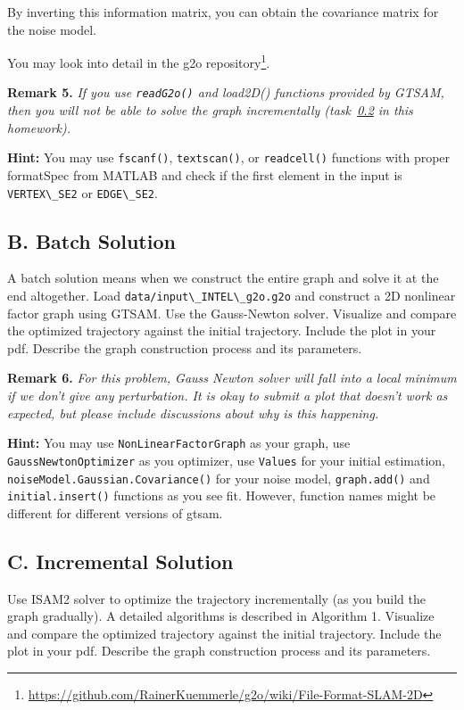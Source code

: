 \documentclass[tp]{lcc}
\begin{document}
By inverting this information matrix, you can obtain the covariance matrix for the noise model.

You may look into detail in the g2o repository\footnote{\url{https://github.com/RainerKuemmerle/g2o/wiki/File-Format-SLAM-2D}}.

\textbf{Remark 5.} \textit{If you use \lstinline[style=bash]{readG2o()} and load2D() functions provided by GTSAM, then you will not be able to solve the graph incrementally (task~\ref{sec:incremental_solution} in this homework).}

\textbf{Hint:} You may use \lstinline[style=bash]{fscanf()}, \lstinline[style=bash]{textscan()}, or \lstinline[style=bash]{readcell()} functions with proper formatSpec from MATLAB and check if the first element in the input is \lstinline[style=bash]{VERTEX\_SE2} or \lstinline[style=bash]{EDGE\_SE2}.

\subsection{B. Batch Solution}
A batch solution means when we construct the entire graph and solve it at the end altogether. Load \lstinline[style=bash]{data/input\_INTEL\_g2o.g2o} and construct a 2D nonlinear factor graph using GTSAM. Use the Gauss-Newton solver. Visualize and compare the optimized trajectory against the initial trajectory. Include the plot in your pdf. Describe the graph construction process and its parameters.

\textbf{Remark 6.} \textit{For this problem, Gauss Newton solver will fall into a local minimum if we don't give any perturbation. It is okay to submit a plot that doesn't work as expected, but please include discussions about why is this happening.}

\textbf{Hint:} You may use \lstinline[style=bash]{NonLinearFactorGraph} as your graph, use \lstinline[style=bash]{GaussNewtonOptimizer} as you optimizer, use \lstinline[style=bash]{Values} for your initial estimation, \lstinline[style=bash]{noiseModel.Gaussian.Covariance()} for your noise model, \lstinline[style=bash]{graph.add()} and \lstinline[style=bash]{initial.insert()} functions as you see fit. However, function names might be different for different versions of gtsam.

\subsection{C. Incremental Solution}
\label{sec:incremental_solution}
Use ISAM2 solver to optimize the trajectory incrementally (as you build the graph gradually). A detailed algorithms is described in Algorithm 1. Visualize and compare the optimized trajectory against the initial trajectory. Include the plot in your pdf. Describe the graph construction process and its parameters.
\end{document}
